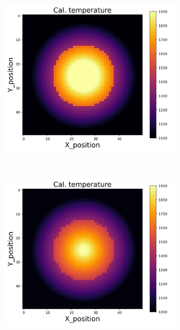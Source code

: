 {\begin{figure}[p]
\begin{minipage}{\textwidth}
\begin{subfigure}{0.325\textwidth}
        \end{subfigure}
        \begin{subfigure}{0.325\textwidth}
            \centering
            \includegraphics[width=\textwidth]{figures/raw_data/21/linear/T_cal.jpg}
        \end{subfigure}
    \end{minipage}\\
    \begin{minipage}{\textwidth}
        \centering
        \begin{subfigure}{0.325\textwidth}
            \centering
            \includegraphics[width=\textwidth]{figures/raw_data/22/linear/T_cal.jpg}

\end{subfigure}
\end{minipage}
\end{figure}}
